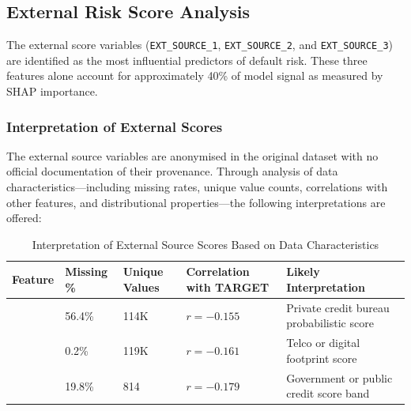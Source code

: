 \subsection{External Risk Score Analysis}
\label{subsec:ext_source_eda}

The external score variables (\texttt{EXT\_SOURCE\_1}, \texttt{EXT\_SOURCE\_2}, and \texttt{EXT\_SOURCE\_3}) are identified as the most influential predictors of default risk. These three features alone account for approximately 40\% of model signal as measured by SHAP importance.





\subsubsection{Interpretation of External Scores}

The external source variables are anonymised in the original dataset with no official documentation of their provenance. Through analysis of data characteristics---including missing rates, unique value counts, correlations with other features, and distributional properties---the following interpretations are offered:

\begin{table}[H]
\centering
\caption{Interpretation of External Source Scores Based on Data Characteristics}
\label{tab:ext_source_interp}
\small
\setlength{\tabcolsep}{4pt}
\begin{tabular}{L{2.9cm}L{1.7cm}L{2.0cm}L{2.4cm}L{4.8cm}}
\toprule
\textbf{Feature} & \textbf{Missing \%} & \textbf{Unique Values} & \textbf{Correlation with TARGET} & \textbf{Likely Interpretation} \\
\midrule
{} & 56.4\% & 114K & $r = -0.155$ & Private credit bureau probabilistic score \\
 & 0.2\% & 119K & $r = -0.161$ & Telco or digital footprint score \\
 & 19.8\% & 814 & $r = -0.179$ & Government or public credit score band \\
\bottomrule
\end{tabular}
\end{table}

